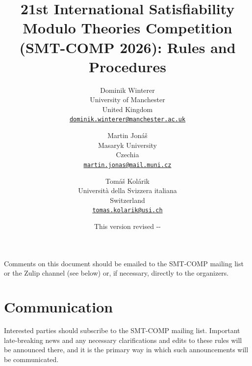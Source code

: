 \documentclass[12pt]{article}
\begin{document}
\date{\small This version revised \the\year-\the\month-\the\day}

\title{21st International Satisfiability Modulo Theories Competition
  (SMT-COMP 2026): Rules and Procedures}

\def\doauthor#1{{%
  \hsize.5\hsize \advance\hsize by-1cm %
  \def\\{\hss\egroup\hbox to\hsize\bgroup\strut\hss}%
  \vbox{\hbox to\hsize\bgroup\strut\hss#1\hss\egroup}}}%

\def\header#1{\medskip\noindent\textbf{#1}}

\author{%
Dominik Winterer\\
University of Manchester\\
United Kingdom\\
{\small\href{mailto:dominik.winterer@manchester.ac.uk}{\texttt{dominik.winterer@manchester.ac.uk}}}
\and
Martin Jon\'{a}\v{s}\\
Masaryk University\\
Czechia\\
{\small\href{mailto:martin.jonas@mail.muni.cz}{\texttt{martin.jonas@mail.muni.cz}}}
\and
Tomáš Kolárik\\
Università della Svizzera italiana\\
Switzerland\\
{\small\href{mailto:tomas.kolarik@usi.ch}{\texttt{tomas.kolarik@usi.ch}}}
}

\maketitle

\noindent Comments on this document should be emailed to the SMT-COMP
mailing list or the Zulip channel (see below) or, if necessary, directly to the organizers.


\section{Communication}

Interested parties should subscribe to the SMT-COMP mailing list.
Important late-breaking news and any necessary clarifications and
edits to these rules will be announced there, and it is the primary
way in which such announcements will be communicated.
\end{document}
